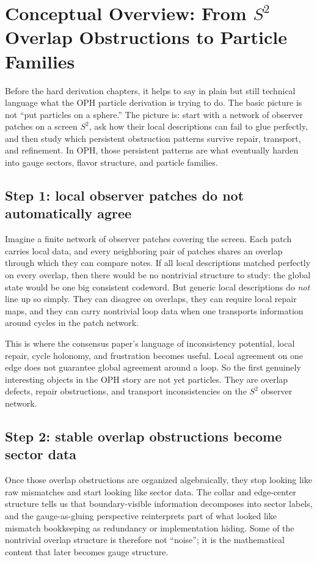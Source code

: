\documentclass[11pt]{article}
\begin{document}
\section{Conceptual Overview: From \texorpdfstring{$S^2$}{S2} Overlap Obstructions to Particle Families}

Before the hard derivation chapters, it helps to say in plain but still technical language what
the OPH particle derivation is trying to do. The basic picture is not ``put particles on a
sphere.'' The picture is: start with a network of observer patches on a screen \(S^2\), ask how
their local descriptions can fail to glue perfectly, and then study which persistent obstruction
patterns survive repair, transport, and refinement. In OPH, those persistent patterns
are what eventually harden into gauge sectors, flavor structure, and particle families.

\subsection{Step 1: local observer patches do not automatically agree}

Imagine a finite network of observer patches covering the screen. Each patch carries local data,
and every neighboring pair of patches shares an overlap through which they can compare notes. If
all local descriptions matched perfectly on every overlap, then there would be no nontrivial
structure to study: the global state would be one big consistent codeword. But generic local
descriptions do \emph{not} line up so simply. They can disagree on overlaps, they can require
local repair maps, and they can carry nontrivial loop data when one transports information around
cycles in the patch network.

This is where the consensus paper's language of inconsistency potential, local repair, cycle
holonomy, and frustration becomes useful. Local agreement on one edge does not guarantee global
agreement around a loop. So the first genuinely interesting objects in the OPH story are not yet
particles. They are overlap defects, repair obstructions, and transport inconsistencies on the
\(S^2\) observer network.

\subsection{Step 2: stable overlap obstructions become sector data}

Once those overlap obstructions are organized algebraically, they stop looking like raw
mismatches and start looking like sector data. The collar and edge-center structure tells us that
boundary-visible information decomposes into sector labels, and the gauge-as-gluing perspective
reinterprets part of what looked like mismatch bookkeeping as redundancy or implementation
hiding. Some of the nontrivial overlap structure is therefore not ``noise''; it is the
mathematical content that later becomes gauge structure.
\end{document}
